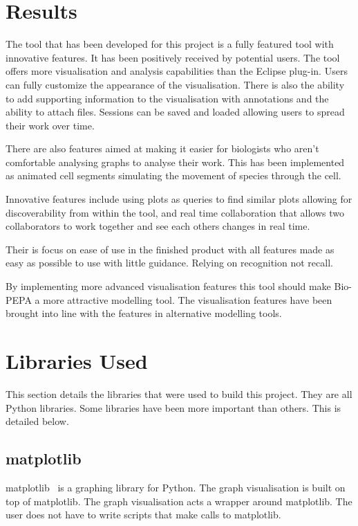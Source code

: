\section{Results}

The tool that has been developed for this project is a fully featured tool with innovative features.  It has been positively received by potential users.
The tool offers more visualisation and analysis capabilities than the Eclipse plug-in.  Users can fully customize the appearance of the visualisation.  There is also the ability to add supporting information to the visualisation with annotations and the ability to attach files.  Sessions can be saved and loaded allowing users to spread their work over time.

There are also features aimed at making it easier for biologists who aren't comfortable analysing graphs to analyse their work.  This has been implemented as animated cell segments simulating the movement of species through the cell.

Innovative features include using plots as queries to find similar plots allowing for discoverability from within the tool, and real time collaboration that allows two collaborators to work together and see each others changes in real time.

Their is focus on ease of use in the finished product with all features made as easy as possible to use with little guidance.  Relying on recognition not recall.

By implementing more advanced visualisation features this tool should make Bio-PEPA a more attractive modelling tool. The visualisation features have been brought into line with the features in alternative modelling tools.

\section{Libraries Used}

This section details the libraries that were used to build this project.  They are all Python libraries.  Some libraries have been more important than others.  This is detailed below.

\subsection{matplotlib}

matplotlib~\cite{mpl} is a graphing library for Python.  The graph visualisation is built on top of matplotlib.  The graph visualisation acts a wrapper around matplotlib.  The user does not have to write scripts that make calls to matplotlib.

